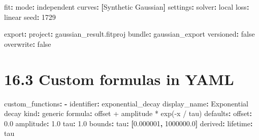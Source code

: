 \documentclass[
  10pt,
  a4paper,
  oneside]{scrreprt}
\newenvironment{Shaded}{}{}
\newcommand{\AttributeTok}[1]{\textcolor[rgb]{0.49,0.56,0.16}{#1}}
\newcommand{\CharTok}[1]{\textcolor[rgb]{0.25,0.44,0.63}{#1}}
\newcommand{\DecValTok}[1]{\textcolor[rgb]{0.25,0.63,0.44}{#1}}
\newcommand{\FloatTok}[1]{\textcolor[rgb]{0.25,0.63,0.44}{#1}}
\newcommand{\FunctionTok}[1]{\textcolor[rgb]{0.02,0.16,0.49}{#1}}
\newcommand{\KeywordTok}[1]{\textcolor[rgb]{0.00,0.44,0.13}{\textbf{#1}}}
\begin{document}
\begin{Shaded}
\begin{Highlighting}[]
\FunctionTok{fit}\KeywordTok{:}
\AttributeTok{  }\FunctionTok{mode}\KeywordTok{:}\AttributeTok{ independent}
\AttributeTok{  }\FunctionTok{curves}\KeywordTok{:}\AttributeTok{ }\KeywordTok{[}\AttributeTok{Synthetic Gaussian}\KeywordTok{]}
\AttributeTok{  }\FunctionTok{settings}\KeywordTok{:}
\AttributeTok{    }\FunctionTok{solver}\KeywordTok{:}\AttributeTok{ local}
\AttributeTok{    }\FunctionTok{loss}\KeywordTok{:}\AttributeTok{ linear}
\AttributeTok{    }\FunctionTok{seed}\KeywordTok{:}\AttributeTok{ }\DecValTok{1729}

\FunctionTok{export}\KeywordTok{:}
\AttributeTok{  }\FunctionTok{project}\KeywordTok{:}\AttributeTok{ gaussian\_result.fitproj}
\AttributeTok{  }\FunctionTok{bundle}\KeywordTok{:}\AttributeTok{ gaussian\_export}
\AttributeTok{  }\FunctionTok{versioned}\KeywordTok{:}\AttributeTok{ }\CharTok{false}
\AttributeTok{  }\FunctionTok{overwrite}\KeywordTok{:}\AttributeTok{ }\CharTok{false}
\end{Highlighting}
\end{Shaded}

\hypertarget{custom-formulas-in-yaml}{%
\section{16.3 Custom formulas in YAML}\label{custom-formulas-in-yaml}}

\begin{Shaded}
\begin{Highlighting}[]
\FunctionTok{custom\_functions}\KeywordTok{:}
\AttributeTok{  }\KeywordTok{{-}}\AttributeTok{ }\FunctionTok{identifier}\KeywordTok{:}\AttributeTok{ exponential\_decay}
\AttributeTok{    }\FunctionTok{display\_name}\KeywordTok{:}\AttributeTok{ Exponential decay}
\AttributeTok{    }\FunctionTok{kind}\KeywordTok{:}\AttributeTok{ generic}
\AttributeTok{    }\FunctionTok{formula}\KeywordTok{:}\AttributeTok{ offset + amplitude * exp({-}x / tau)}
\AttributeTok{    }\FunctionTok{defaults}\KeywordTok{:}
\AttributeTok{      }\FunctionTok{offset}\KeywordTok{:}\AttributeTok{ }\FloatTok{0.0}
\AttributeTok{      }\FunctionTok{amplitude}\KeywordTok{:}\AttributeTok{ }\FloatTok{1.0}
\AttributeTok{      }\FunctionTok{tau}\KeywordTok{:}\AttributeTok{ }\FloatTok{1.0}
\AttributeTok{    }\FunctionTok{bounds}\KeywordTok{:}
\AttributeTok{      }\FunctionTok{tau}\KeywordTok{:}\AttributeTok{ }\KeywordTok{[}\FloatTok{0.000001}\KeywordTok{,}\AttributeTok{ }\FloatTok{1000000.0}\KeywordTok{]}
\AttributeTok{    }\FunctionTok{derived}\KeywordTok{:}
\AttributeTok{      }\FunctionTok{lifetime}\KeywordTok{:}\AttributeTok{ tau}
\end{Highlighting}
\end{Shaded}
\end{document}
